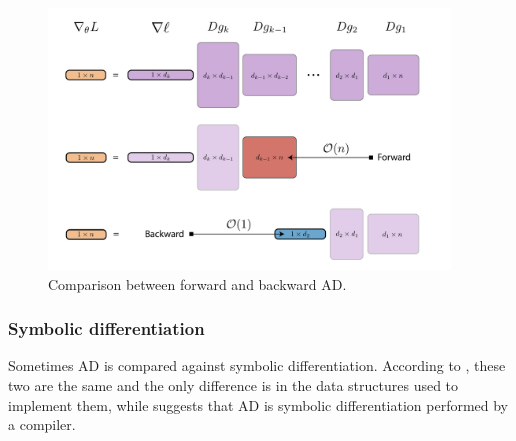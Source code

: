 \begin{figure}
    \centering
    \includegraphics[width=0.95\textwidth]{figures/VJP-JVP.png}
    \caption{Comparison between forward and backward AD.}
    \label{fig:vjp-jvp}
\end{figure}

\subsubsection{Symbolic differentiation}

Sometimes AD is compared against symbolic differentiation.
According to \cite{Laue2020}, these two are the same and the only difference is in the data structures used to implement them, while \cite{Elliott_2018} suggests that AD is symbolic differentiation performed by a compiler.
